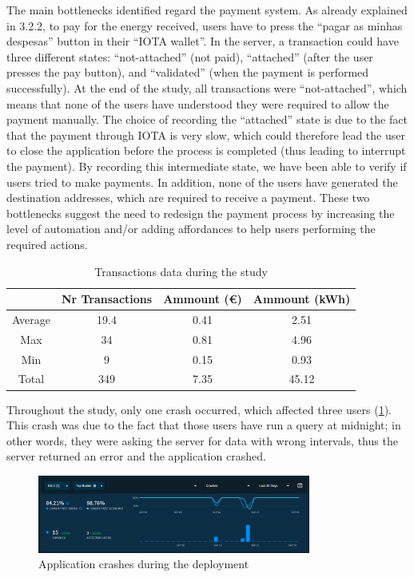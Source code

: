 The main bottlenecks identified regard the payment system. As already explained in 3.2.2, to pay for the energy received, users have to press the “pagar as minhas despesas” button in their “IOTA wallet”. In the server, a transaction could have three different states: “not-attached” (not paid), “attached” (after the user presses the pay button), and “validated” (when the payment is performed successfully). At the end of the study, all transactions were “not-attached”, which means that none of the users have understood they were required to allow the payment manually. The choice of recording the “attached” state is due to the fact that the payment through IOTA is very slow, which could therefore lead the user to close the application before the process is completed (thus leading to interrupt the payment). By recording this intermediate state, we have been able to verify if users tried to make payments. In addition, none of the users have generated the destination addresses, which are required to receive a payment. These two bottlenecks suggest the need to redesign the payment process by increasing the level of automation and/or adding affordances to help users performing the required actions.

\begin{table}[htb]
\centering
\normalsize
    \caption{Transactions data during the study}
    \label{tab:tr}
{\footnotesize
    \begin{tabular}{ | c | c | c | c | }
    \hline 
    	& \textbf{Nr Transactions} & \textbf{Ammount (\euro)} & \textbf{Ammount (kWh)}\\ \hline \hline
    Average  & 19.4  &  0.41  &   2.51 \\ \hline
    Max  & 34   &  0.81  &   4.96 \\ \hline 
    Min  & 9   &  0.15  &   0.93 \\ \hline
    Total  & 349  &  7.35  & 45.12 \\ \hline
    \end{tabular}
    }
\end{table}

Throughout the study, only one crash occurred, which affected three users (\cref{fig:crash}). This crash was due to the fact that those users have run a query at midnight; in other words, they were asking the server for data with wrong intervals, thus the server returned an error and the application crashed.

 \begin{figure}[h]
\centering
\includegraphics[width=0.8\textwidth]{./Images/crash}
\caption{Application crashes during the deployment}
\label{fig:crash}
\end{figure}